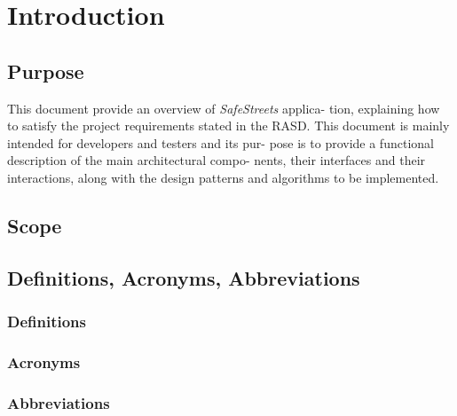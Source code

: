 \section{Introduction}

\subsection{Purpose}
This document provide an overview of \textit{SafeStreets} applica-
tion, explaining how to satisfy the project requirements stated in the
RASD.
This document is mainly intended for developers and testers and its pur-
pose is to provide a functional description of the main architectural compo-
nents, their interfaces and their interactions, along with the design patterns
and algorithms to be implemented.
\subsection{Scope}

\subsection{Definitions, Acronyms, Abbreviations}
    \subsubsection{Definitions}
        
    \subsubsection{Acronyms}
    
    \subsubsection{Abbreviations}





